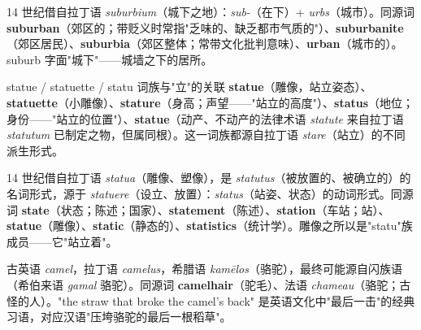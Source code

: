 \documentclass[../main.tex]{subfiles}
\begin{document}
\begin{origin}
14 世纪借自拉丁语 \textit{suburbium}（城下之地）：\textit{sub-}（在下）+ \textit{urbs}（城市）。同源词 \textbf{suburban}（郊区的；带贬义时常指"乏味的、缺乏都市气质的"）、\textbf{suburbanite}（郊区居民）、\textbf{suburbia}（郊区整体；常带文化批判意味）、\textbf{urban}（城市的）。suburb 字面"城下"——城墙之下的居所。
\end{origin}



\begin{lex}{statue / statuette / statu 词族与"立"的关联}
\textbf{statue}（雕像，站立姿态）、\textbf{statuette}（小雕像）、\textbf{stature}（身高；声望——"站立的高度"）、\textbf{status}（地位；身份——"站立的位置"）、\textbf{statue}（动产、不动产的法律术语 \textit{statute} 来自拉丁语 \textit{statutum} 已制定之物，但属同根）。这一词族都源自拉丁语 \textit{stare}（站立）的不同派生形式。
\end{lex}

\begin{origin}
14 世纪借自拉丁语 \textit{statua}（雕像、塑像），是 \textit{statutus}（被放置的、被确立的）的名词形式，源于 \textit{statuere}（设立、放置）：\textit{status}（站姿、状态）的动词形式。同源词 \textbf{state}（状态；陈述；国家）、\textbf{statement}（陈述）、\textbf{station}（车站；站）、\textbf{statue}（雕像）、\textbf{static}（静态的）、\textbf{statistics}（统计学）。雕像之所以是"statu"族成员——它"站立着"。
\end{origin}



\begin{origin}
古英语 \textit{camel}，拉丁语 \textit{camelus}，希腊语 \textit{kamēlos}（骆驼），最终可能源自闪族语（希伯来语 \textit{gamal} 骆驼）。同源词 \textbf{camelhair}（驼毛）、法语 \textit{chameau}（骆驼；古怪的人）。"the straw that broke the camel's back" 是英语文化中"最后一击"的经典习语，对应汉语"压垮骆驼的最后一根稻草"。
\end{origin}
\end{document}
